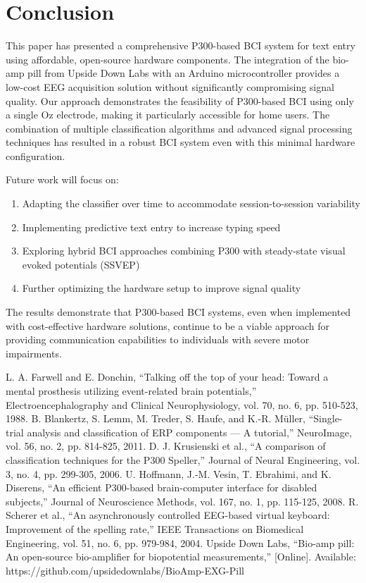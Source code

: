 \documentclass[conference]{IEEEtran}
\begin{document}
\section{Conclusion}
This paper has presented a comprehensive P300-based BCI system for text entry using affordable, open-source hardware components. The integration of the bio-amp pill from Upside Down Labs with an Arduino microcontroller provides a low-cost EEG acquisition solution without significantly compromising signal quality. Our approach demonstrates the feasibility of P300-based BCI using only a single Oz electrode, making it particularly accessible for home users. The combination of multiple classification algorithms and advanced signal processing techniques has resulted in a robust BCI system even with this minimal hardware configuration.

Future work will focus on:
\begin{enumerate}
\item Adapting the classifier over time to accommodate session-to-session variability
\item Implementing predictive text entry to increase typing speed
\item Exploring hybrid BCI approaches combining P300 with steady-state visual evoked potentials (SSVEP)
\item Further optimizing the hardware setup to improve signal quality
\end{enumerate}

The results demonstrate that P300-based BCI systems, even when implemented with cost-effective hardware solutions, continue to be a viable approach for providing communication capabilities to individuals with severe motor impairments.

\begin{thebibliography}{00}
 L. A. Farwell and E. Donchin, ``Talking off the top of your head: Toward a mental prosthesis utilizing event-related brain potentials,'' Electroencephalography and Clinical Neurophysiology, vol. 70, no. 6, pp. 510-523, 1988.
 B. Blankertz, S. Lemm, M. Treder, S. Haufe, and K.-R. Müller, ``Single-trial analysis and classification of ERP components — A tutorial,'' NeuroImage, vol. 56, no. 2, pp. 814-825, 2011.
 D. J. Krusienski et al., ``A comparison of classification techniques for the P300 Speller,'' Journal of Neural Engineering, vol. 3, no. 4, pp. 299-305, 2006.
 U. Hoffmann, J.-M. Vesin, T. Ebrahimi, and K. Diserens, ``An efficient P300-based brain-computer interface for disabled subjects,'' Journal of Neuroscience Methods, vol. 167, no. 1, pp. 115-125, 2008.
 R. Scherer et al., ``An asynchronously controlled EEG-based virtual keyboard: Improvement of the spelling rate,'' IEEE Transactions on Biomedical Engineering, vol. 51, no. 6, pp. 979-984, 2004.
 Upside Down Labs, ``Bio-amp pill: An open-source bio-amplifier for biopotential measurements,'' [Online]. Available: https://github.com/upsidedownlabs/BioAmp-EXG-Pill
\end{thebibliography}
\end{document}
